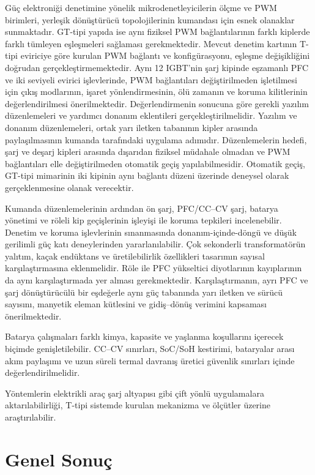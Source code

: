 Güç elektroniği denetimine yönelik mikrodenetleyicilerin ölçme ve PWM birimleri, yerleşik dönüştürücü topolojilerinin kumandası için esnek olanaklar sunmaktadır. GT-tipi yapıda ise aynı fiziksel PWM bağlantılarının farklı kiplerde farklı tümleyen eşleşmeleri sağlaması gerekmektedir. Mevcut denetim kartının T-tipi eviriciye göre kurulan PWM bağlantı ve konfigürasyonu, eşleşme değişikliğini doğrudan gerçekleştirmemektedir. Aynı \num{12} IGBT'nin şarj kipinde eşzamanlı PFC ve iki seviyeli evirici işlevlerinde, PWM bağlantıları değiştirilmeden işletilmesi için çıkış modlarının, işaret yönlendirmesinin, ölü zamanın ve koruma kilitlerinin değerlendirilmesi önerilmektedir. Değerlendirmenin sonucuna göre gerekli yazılım düzenlemeleri ve yardımcı donanım eklentileri gerçekleştirilmelidir. Yazılım ve donanım düzenlemeleri, ortak yarı iletken tabanının kipler arasında paylaşılmasının kumanda tarafındaki uygulama adımıdır. Düzenlemelerin hedefi, şarj ve deşarj kipleri arasında dışarıdan fiziksel müdahale olmadan ve PWM bağlantıları elle değiştirilmeden otomatik geçiş yapılabilmesidir. Otomatik geçiş, GT-tipi mimarinin iki kipinin aynı bağlantı düzeni üzerinde deneysel olarak gerçeklenmesine olanak verecektir.

Kumanda düzenlemelerinin ardından ön şarj, PFC/CC--CV şarj, batarya yönetimi ve röleli kip geçişlerinin işleyişi ile koruma tepkileri incelenebilir. Denetim ve koruma işlevlerinin sınanmasında donanım-içinde-döngü ve düşük gerilimli güç katı deneylerinden yararlanılabilir. Çok sekonderli transformatörün yalıtım, kaçak endüktans ve üretilebilirlik özellikleri tasarımın sayısal karşılaştırmasına eklenmelidir. Röle ile PFC yükseltici diyotlarının kayıplarının da aynı karşılaştırmada yer alması gerekmektedir. Karşılaştırmanın, ayrı PFC ve şarj dönüştürücülü bir eşdeğerle aynı güç tabanında yarı iletken ve sürücü sayısını, manyetik eleman kütlesini ve gidiş--dönüş verimini kapsaması önerilmektedir.

Batarya çalışmaları farklı kimya, kapasite ve yaşlanma koşullarını içerecek biçimde genişletilebilir. CC--CV sınırları, SoC/SoH kestirimi, bataryalar arası akım paylaşımı ve uzun süreli termal davranış üretici güvenlik sınırları içinde değerlendirilmelidir.

Yöntemlerin elektrikli araç şarj altyapısı gibi çift yönlü uygulamalara aktarılabilirliği, T-tipi sistemde kurulan mekanizma ve ölçütler üzerine araştırılabilir.

\section{Genel Sonuç}

